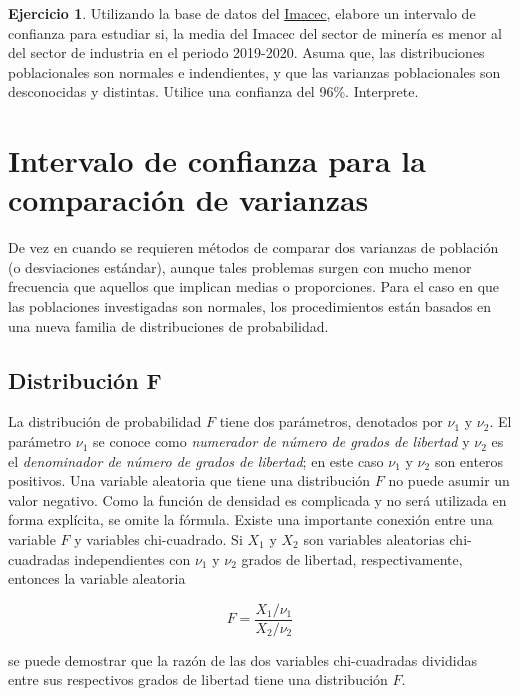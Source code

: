 \documentclass[
  11pt,
]{book}
\theoremstyle{definition}
\theoremstyle{definition}
\theoremstyle{definition}
\newtheorem{exercise}{Ejercicio}[chapter]
\theoremstyle{definition}
\theoremstyle{remark}
\begin{document}
\begin{exercise}
Utilizando la base de datos del \hyperref[Imacec]{Imacec}, elabore un intervalo de confianza para estudiar si, la media del Imacec del sector de minería es menor al del sector de industria en el periodo 2019-2020. Asuma que, las distribuciones poblacionales son normales e indendientes, y que las varianzas poblacionales son desconocidas y distintas. Utilice una confianza del 96\%. Interprete.
\end{exercise}

\section{Intervalo de confianza para la comparación de varianzas}\label{intervalo-de-confianza-comparacion-de-varianzas}

De vez en cuando se requieren métodos de comparar dos varianzas de población (o desviaciones estándar), aunque tales problemas surgen con mucho menor frecuencia que aquellos que implican medias o proporciones. Para el caso en que las poblaciones investigadas son normales, los procedimientos están basados en una nueva familia de distribuciones de probabilidad.

\subsection*{Distribución F}\label{distribucion-f}

La distribución de probabilidad \(F\) tiene dos parámetros, denotados por \(\nu_{1}\) y \(\nu_{2}\). El parámetro \(\nu_{1}\) se conoce como \textit{numerador de número de grados de libertad} y \(\nu_{2}\) es el \textit{denominador de número de grados de libertad}; en este caso \(\nu_{1}\) y \(\nu_{2}\) son enteros positivos. Una variable aleatoria que tiene una distribución \(F\) no puede asumir un valor negativo. Como la función de densidad es complicada y no será utilizada en forma explícita, se omite la fórmula. Existe una importante conexión entre una variable \(F\) y variables chi-cuadrado. Si \(X_{1}\) y \(X_{2}\) son variables aleatorias chi-cuadradas independientes con \(\nu_{1}\) y \(\nu_{2}\) grados de libertad, respectivamente, entonces la variable aleatoria

\[
F = \frac{X_{1}/\nu_{1}}{X_{2}/\nu_{2}}
\]

se puede demostrar que la razón de las dos variables chi-cuadradas divididas entre sus respectivos grados de libertad tiene una distribución \(F\). \citep[página 360]{Devore}
\end{document}
